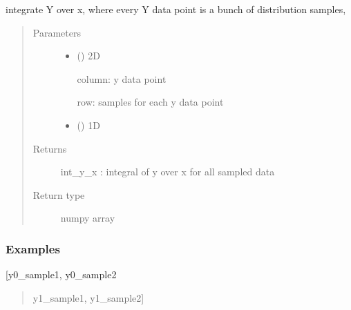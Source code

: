 \documentclass[letterpaper,10pt,english]{sphinxmanual}
\begin{document}

\begin{fulllineitems}
\label{\detokenize{helper_func:helper_func.sample_integral}}
\sphinxAtStartPar
integrate Y over x, where every Y data point is a bunch of distribution samples,
\begin{quote}\begin{description}
\item[{Parameters}] \leavevmode\begin{itemize}
\item {} 
\sphinxAtStartPar
{} () \textendash{} 
\sphinxAtStartPar
2D

\sphinxAtStartPar
column: y data point

\sphinxAtStartPar
row: samples for each y data point


\item {} 
\sphinxAtStartPar
{} () \textendash{} 1D

\end{itemize}

\item[{Returns}] \leavevmode
\sphinxAtStartPar
int\_y\_x : integral of y over x for all sampled data

\item[{Return type}] \leavevmode
\sphinxAtStartPar
numpy array

\end{description}\end{quote}
\subsubsection*{Examples}

\sphinxAtStartPar
{[}y0\_sample1, y0\_sample2
\begin{quote}

\sphinxAtStartPar
y1\_sample1, y1\_sample2{]}
\end{quote}

\end{fulllineitems}
\end{document}
